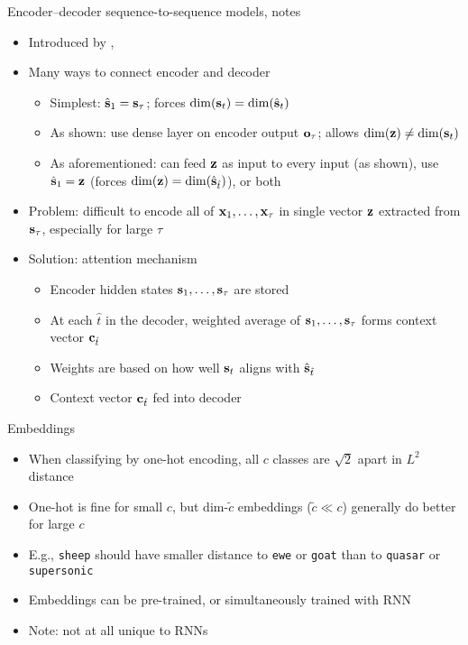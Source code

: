 \begin{frame}{Encoder--decoder sequence-to-sequence models, notes}
    \begin{itemize}
        \item Introduced by \citet{ChoEMNLP14}, \citet{Sutskever14}
        \item Many ways to connect encoder and decoder
        \begin{itemize}
            \item Simplest: $\hat{\mathbf{s}}_1 = \mathbf{s}_\tau$; forces $\dim(\mathbf{s}_t) = \dim(\hat{\mathbf{s}}_t)$
            \item As shown: use dense layer on encoder output $\mathbf{o}_\tau$; allows $\dim(\mathbf{z}) \ne \dim(\mathbf{s}_t)$
            \item As aforementioned: can feed $\mathbf{z}$ as input to every input (as shown), use $\hat{\mathbf{s}}_1 = \mathbf{z}$ (forces $\dim(\mathbf{z}) = \dim(\hat{\mathbf{s}}_{\hat{t}})$), or both
        \end{itemize}
        \pause
        \item Problem: difficult to encode all of $\mathbf{x}_1, \dots, \mathbf{x}_\tau$ in single vector $\mathbf{z}$ extracted from $\mathbf{s}_\tau$, especially for large $\tau$
        \item Solution: attention mechanism \citep{BahdanauICLR15}
        \begin{itemize}
            \item Encoder hidden states $\mathbf{s}_1, \dots, \mathbf{s}_\tau$ are stored
            \item At each $\hat{t}$ in the decoder, weighted average of $\mathbf{s}_1, \dots, \mathbf{s}_\tau$ forms context vector $\mathbf{c}_{\hat{t}}$
            \item Weights are based on how well $\mathbf{s}_t$ aligns with $\hat{\mathbf{s}}_{\hat{t}}$
            \item Context vector $\mathbf{c}_{\hat{t}}$ fed into decoder
        \end{itemize}
    \end{itemize}
\end{frame}

\begin{frame}{Embeddings}
    \begin{itemize}
        \item When classifying by one-hot encoding, all $c$ classes are $\sqrt{2}$ apart in $L^2$ distance
        \item One-hot is fine for small $c$, but dim-$\tilde{c}$ embeddings ($\tilde{c} \ll c$) generally do better for large $c$
        \item E.g., \texttt{sheep} should have smaller distance to \texttt{ewe} or \texttt{goat} than to \texttt{quasar} or \texttt{supersonic}
        \item Embeddings can be pre-trained, or simultaneously trained with RNN
        \item Note: not at all unique to RNN{}s
    \end{itemize}

    
\end{frame}

